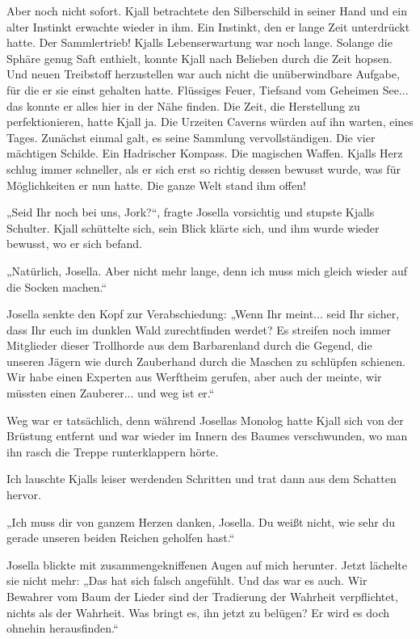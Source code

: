 Aber noch nicht sofort. Kjall betrachtete den Silberschild in seiner Hand und ein alter Instinkt erwachte wieder in ihm. Ein Instinkt, den er lange Zeit unterdrückt hatte. Der Sammlertrieb! Kjalls Lebenserwartung war noch lange. Solange die Sphäre genug Saft enthielt, konnte Kjall nach Belieben durch die Zeit hopsen. Und neuen Treibstoff herzustellen war auch nicht die unüberwindbare Aufgabe, für die er sie einst gehalten hatte. Flüssiges Feuer, Tiefsand vom Geheimen See... das konnte er alles hier in der Nähe finden. Die Zeit, die Herstellung zu perfektionieren, hatte Kjall ja. Die Urzeiten Caverns würden auf ihn warten, eines Tages. Zunächst einmal galt, es seine Sammlung vervollständigen. Die vier mächtigen Schilde. Ein Hadrischer Kompass. Die magischen Waffen. Kjalls Herz schlug immer schneller, als er sich erst so richtig dessen bewusst wurde, was für Möglichkeiten er nun hatte. Die ganze Welt stand ihm offen!

„Seid Ihr noch bei uns, Jork?“, fragte Josella vorsichtig und stupste Kjalls Schulter. Kjall schüttelte sich, sein Blick klärte sich, und ihm wurde wieder bewusst, wo er sich befand.

„Natürlich, Josella. Aber nicht mehr lange, denn ich muss mich gleich wieder auf die Socken machen.“

Josella senkte den Kopf zur Verabschiedung: „Wenn Ihr meint... seid Ihr sicher, dass Ihr euch im dunklen Wald zurechtfinden werdet? Es streifen noch immer Mitglieder dieser Trollhorde aus dem Barbarenland durch die Gegend, die unseren Jägern wie durch Zauberhand durch die Maschen zu schlüpfen schienen. Wir habe einen Experten aus Werftheim gerufen, aber auch der meinte, wir müssten einen Zauberer... und weg ist er.“



\trennzeichen



Weg war er tatsächlich, denn während Josellas Monolog hatte Kjall sich von der Brüstung entfernt und war wieder im Innern des Baumes verschwunden, wo man ihn rasch die Treppe runterklappern hörte.

Ich lauschte Kjalls leiser werdenden Schritten und trat dann aus dem Schatten hervor.

„Ich muss dir von ganzem Herzen danken, Josella. Du weißt nicht, wie sehr du gerade unseren beiden Reichen geholfen hast.“

Josella blickte mit zusammengekniffenen Augen auf mich herunter. Jetzt lächelte sie nicht mehr: „Das hat sich falsch angefühlt. Und das war es auch. Wir Bewahrer vom Baum der Lieder sind der Tradierung der Wahrheit verpflichtet, nichts als der Wahrheit. Was bringt es, ihn jetzt zu belügen? Er wird es doch ohnehin herausfinden.“

